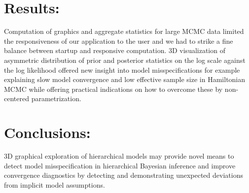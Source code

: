\documentclass[11pt,notitlepage]{article}
\begin{document}
\section*{Results:}

Computation of graphics and aggregate statistics for large MCMC data limited the responsiveness of our application to the user and we had to strike a fine balance between startup and responsive computation. 3D visualization of asymmetric distribution of prior and posterior statistics on the log scale against the log likelihood offered new insight into model misspecifications for example explaining slow model convergence and low effective sample size in Hamiltonian MCMC while offering practical indications on how to overcome these by non-centered parametrization.
\section*{Conclusions:}
3D graphical exploration of hierarchical models may provide novel means to detect model misspecification in hierarchical Bayesian inference and improve convergence diagnostics by detecting and demonstrating unexpected deviations from implicit model assumptions.


\newpage


\end{document}
